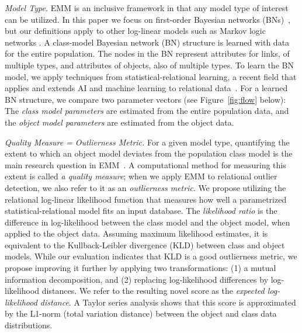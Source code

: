 {{\em Model Type.} EMM is an inclusive framework in that any model type of interest can be utilized. In this paper we focus on first-order Bayesian networks (BNs)~\citep{Wang2008,Poole2003,Kimmig2014}, but our definitions apply to other log-linear models such as Markov logic networks \citep{Domingos2007}. 
A class-model Bayesian network (BN) structure is learned with data for the entire population. The nodes in the BN represent attributes for links, of multiple types, and attributes of objects, also of multiple types. To learn the BN model, we apply techniques from statistical-relational learning, a  recent field that applies and extends AI and machine learning to relational data~\citep{SRL2007,Schulte2012,Domingos2009}. For a learned BN structure, we compare two parameter vectors (see Figure~\ref{fig:flow} below): The {\em class model parameters} are estimated from the entire population data, and the {\em object model parameters} are estimated from the object data. 

{\em Quality Measure = Outlierness Metric.} For a given model type, quantifying the extent to which an object model deviates from the population class model is the main research question in EMM~\citep{Duivesteijn2016}. A computational method for measuring this extent is called {\em a quality measure}; when we apply EMM to relational outlier detection, we also refer to it as an {\em outlierness metric}. We propose utilizing the relational log-linear likelihood function \citep{Kimmig2014,Schulte2011} that measures how well a parametrized statistical-relational model fits an input database. The {\em likelihood ratio} is the difference in log-likelihood between the class model and the object model, when applied to the object data. Assuming maximum likelihood estimates, it is equivalent to the Kullback-Leibler divergence (KLD) between class and object models. While our evaluation indicates that KLD is a good outlierness metric, we propose improving it further by applying two transformations: (1) a mutual information decomposition, and (2) replacing log-likelihood differences by log-likelihood distances. We refer to the resulting novel score as the {\em expected log-likelihood distance}. A Taylor series analysis shows that this score  is approximated by the L1-norm (total variation distance) between the object and class data distributions.


}
